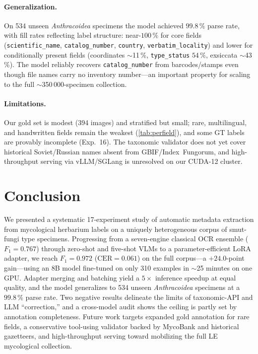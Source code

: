 \paragraph{Generalization.}
On 534 unseen \emph{Anthracoidea} specimens the model achieved $99.8\,\%$ parse
rate, with fill rates reflecting label structure: near-$100\,\%$ for core fields
(\texttt{scientific\_name}, \texttt{catalog\_number}, \texttt{country},
\texttt{verbatim\_locality}) and lower for conditionally present fields
(coordinates $\sim$11\,\%, \texttt{type\_status} $54\,\%$, exsiccata
$\sim$43\,\%). The model reliably recovers \texttt{catalog\_number} from
barcodes/stamps even though file names carry no inventory number---an important
property for scaling to the full $\sim$350\,000-specimen collection.

\paragraph{Limitations.}
Our gold set is modest (394 images) and stratified but small; rare, multilingual,
and handwritten fields remain the weakest (\cref{tab:perfield}), and some GT
labels are provably incomplete (Exp.~16). The taxonomic validator does not yet
cover historical Soviet/Russian names absent from GBIF/Index~Fungorum, and
high-throughput serving via vLLM/SGLang is unresolved on our CUDA-12 cluster.

\section{Conclusion}
\label{sec:conclusion}

We presented a systematic 17-experiment study of automatic metadata extraction
from mycological herbarium labels on a uniquely heterogeneous corpus of
smut-fungi type specimens. Progressing from a seven-engine classical OCR
ensemble ($F_1=0.767$) through zero-shot and five-shot VLMs to a
parameter-efficient LoRA adapter, we reach $F_1=0.972$ ($\mathrm{CER}=0.061$) on
the full corpus---a $+24.0$-point gain---using an 8B model fine-tuned on only
310 examples in $\sim$25 minutes on one GPU. Adapter merging and batching yield
a $5\times$ inference speedup at equal quality, and the model generalizes to
534 unseen \emph{Anthracoidea} specimens at a $99.8\,\%$ parse rate. Two
negative results delineate the limits of taxonomic-API and LLM ``correction,''
and a cross-model audit shows the ceiling is partly set by annotation
completeness. Future work targets expanded gold annotation for rare fields, a
conservative tool-using validator backed by MycoBank and historical gazetteers,
and high-throughput serving toward mobilizing the full LE mycological
collection.
